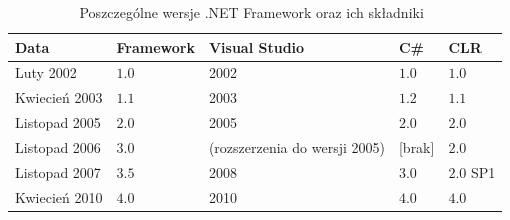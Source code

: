 \begin{table}
	\centering
	\begin{tabular}{l|l|l|l|l}
	\textbf{Data} & \textbf{Framework} & \textbf{Visual Studio} & \textbf{C\#} & \textbf{CLR} \\ \hline
	Luty 2002 & $1.0$ & 2002 & $1.0$ & $1.0$ \\ 
	Kwiecień 2003 & $1.1$ & 2003 & $1.2$ & $1.1$ \\ 
	Listopad 2005 & $2.0$ & 2005 & $2.0$ & $2.0$ \\ 
	Listopad 2006 & $3.0$ & (rozszerzenia do wersji 2005) & [brak] & $2.0$ \\ 
	Listopad 2007 & $3.5$ & 2008 & $3.0$ & $2.0$ SP1 \\ 
	Kwiecień 2010 & $4.0$ & 2010 & $4.0$ & $4.0$ \\
	\end{tabular}
	\caption{Poszczególne wersje .NET Framework oraz ich składniki~\cite{cSharp:inDepthS}\label{dotNet:dates}}
\end{table}

